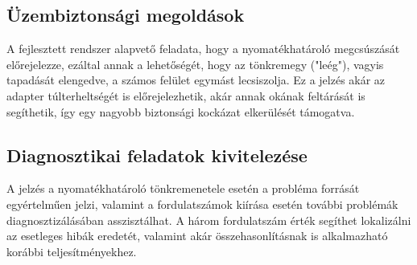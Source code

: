 \subsection{Üzembiztonsági megoldások}

A fejlesztett rendszer alapvető feladata, hogy a nyomatékhatároló megcsúszását előrejelezze, ezáltal annak a lehetőségét, hogy az tönkremegy ("leég"), vagyis tapadását elengedve, a számos felület egymást lecsiszolja. Ez a jelzés akár az adapter túlterheltségét is előrejelezhetik, akár annak okának feltárását is segíthetik, így egy nagyobb biztonsági kockázat elkerülését támogatva.

\subsection{Diagnosztikai feladatok kivitelezése}

A jelzés a nyomatékhatároló tönkremenetele esetén a probléma forrását egyértelműen jelzi, valamint a fordulatszámok kiírása esetén további problémák diagnosztizálásában asszisztálhat. A három fordulatszám érték segíthet lokalizálni az esetleges hibák eredetét, valamint akár összehasonlításnak is alkalmazható korábbi teljesítményekhez.

